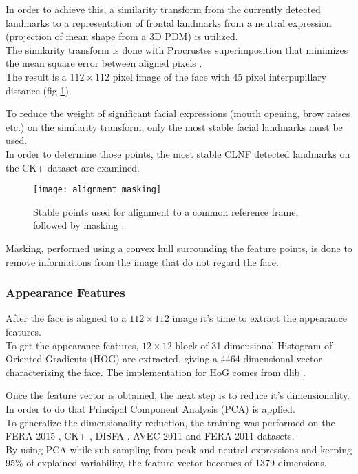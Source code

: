 In order to achieve this, a similarity transform from the currently detected landmarks to a representation of frontal landmarks from a neutral expression (projection of mean shape from a 3D PDM) is utilized. \\
The similarity transform is done with Procrustes superimposition that minimizes the mean square error between aligned pixels \cite{Baltru2013}.\\
The result is a $112 \times 112$ pixel image of the face with 45 pixel interpupillary distance (fig \ref{fig:alignment_masking}). 

To reduce the weight of significant facial expressions (mouth opening, brow raises etc.) on the similarity transform, only the most stable facial landmarks must be used. \\
In order to determine those points, the most stable CLNF detected landmarks on the CK+ dataset \cite{CK+} are examined.

\begin{figure}[H]
	\centering
	\texttt{[image: alignment\_masking]}
	\caption{Stable points used for alignment to a common reference frame, followed by masking \cite{Baltru2015}.}
	\label{fig:alignment_masking}
\end{figure}

Masking, performed using a convex hull surrounding the feature points, is done to remove informations from the image that do not regard the face.

\subsubsection{Appearance Features}
After the face is aligned to a $112 \times 112$ image it's time to extract the appearance features. \\
To get the appearance features, $12 \times 12$ block of 31 dimensional Histogram of Oriented Gradients (HOG) are extracted, giving a 4464 dimensional vector characterizing the face. The implementation for HoG comes from dlib \cite{dlib}.

Once the feature vector is obtained, the next step is to reduce it's dimensionality. In order to do that Principal Component Analysis (PCA) is applied. \\
To generalize the dimensionality reduction, the training was performed on the FERA 2015 \cite{FERA15}, CK+ \cite{CK+}, DISFA \cite{DISFA}, AVEC 2011 \cite{AVEC11} and FERA 2011 \cite{FERA11} datasets. \\
By using PCA while sub-sampling from peak and neutral expressions and keeping 95\% of explained variability, the feature vector becomes of 1379 dimensions.

